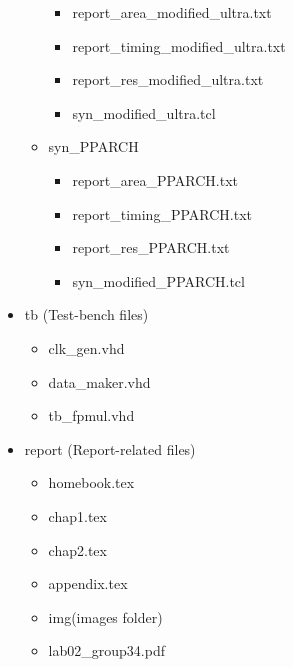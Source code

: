 \begin{itemize}
\begin{itemize}
         \begin{itemize}
            \item report\_area\_modified\_ultra.txt
            \item report\_timing\_modified\_ultra.txt
            \item report\_res\_modified\_ultra.txt
            \item syn\_modified\_ultra.tcl
        \end{itemize}
        \item syn\_PPARCH
         \begin{itemize}
            \item report\_area\_PPARCH.txt
            \item report\_timing\_PPARCH.txt
            \item report\_res\_PPARCH.txt
            \item syn\_modified\_PPARCH.tcl
        \end{itemize}
    \end{itemize}
    \item tb (Test-bench files)
         \begin{itemize}
            \item clk\_gen.vhd
            \item data\_maker.vhd
            \item tb\_fpmul.vhd
        \end{itemize}  
    \item report (Report-related files)
    	\begin{itemize}
    		\item homebook.tex
    		\item chap1.tex
    		\item chap2.tex
    		\item appendix.tex
    		\item img(images folder)
    		\item lab02\_group34.pdf
		\end{itemize}    	  
\end{itemize}